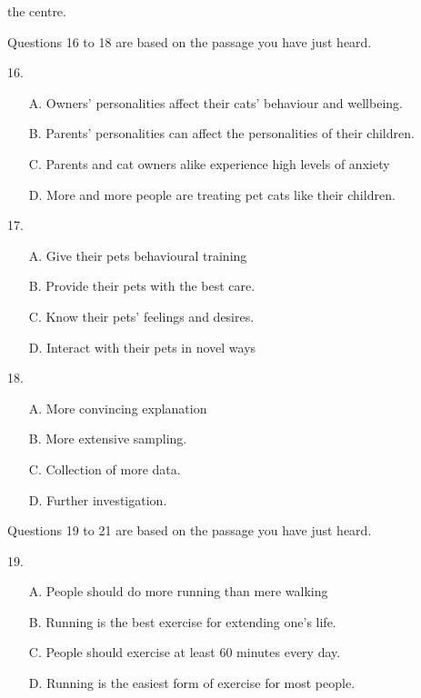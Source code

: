 \documentclass[UTF8,11pt]{ctexart}
\begin{document}
the centre.


Questions 16 to 18 are based on the passage you have just heard.


16.


\begin{itemize}[leftmargin=2em,itemsep=.2em,topsep=.4em]\item[A.] Owners' personalities affect their cats' behaviour and wellbeing.
\item[B.] Parents' personalities can affect the personalities of their children.
\item[C.] Parents and cat owners alike experience high levels of anxiety
\end{itemize}

\begin{itemize}[leftmargin=2em,itemsep=.2em,topsep=.4em]\item[D.] More and more people are treating pet cats like their children.
\end{itemize}

17.


\begin{itemize}[leftmargin=2em,itemsep=.2em,topsep=.4em]\item[A.] Give their pets behavioural training
\item[B.] Provide their pets with the best care.
\item[C.] Know their pets' feelings and desires.
\item[D.] Interact with their pets in novel ways
\end{itemize}

18.


\begin{itemize}[leftmargin=2em,itemsep=.2em,topsep=.4em]\item[A.] More convincing explanation
\item[B.] More extensive sampling.
\item[C.] Collection of more data.
\item[D.] Further investigation.
\end{itemize}

Questions 19 to 21 are based on the passage you have just heard.


19.


\begin{itemize}[leftmargin=2em,itemsep=.2em,topsep=.4em]\item[A.] People should do more running than mere walking
\item[B.] Running is the best exercise for extending one's life.
\item[C.] People should exercise at least 60 minutes every day.
\item[D.] Running is the easiest form of exercise for most people.
\end{itemize}
\end{document}

